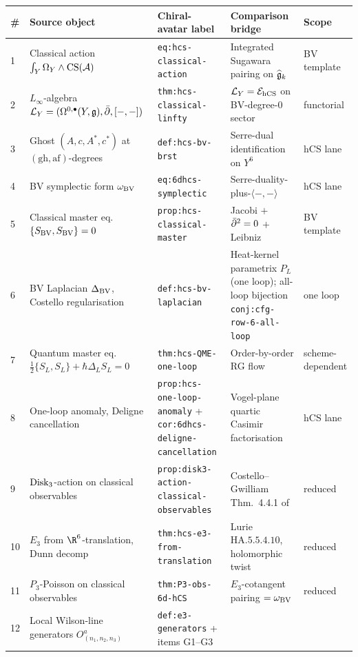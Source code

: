 {\small
\begin{center}
\renewcommand{\arraystretch}{1.20}
\begin{tabular}{p{0.7cm}p{3.5cm}p{3.3cm}p{3.3cm}p{1.9cm}}
\toprule
\# & Source object
 & Chiral-avatar label
 & Comparison bridge
 & Scope \\
\midrule
1 & Classical action $\int_Y\Omega_Y\wedge\mathrm{CS}(\mathcal{A})$
 & \texttt{eq:hcs-classical-action}
 & Integrated Sugawara pairing on $\widehat{\mathfrak{g}}_k$
 & BV template \\
2 & $L_\infty$-algebra $\mathcal{L}_Y = (\Omega^{0,\bullet}(Y,\mathfrak{g}),\bar\partial,[-,-])$
 & \texttt{thm:hcs-classical-linfty}
 & $\mathcal{L}_Y = \mathcal{E}_{\mathrm{hCS}}$ on BV-degree-$0$ sector
 & functorial \\
3 & Ghost $(A, c, A^*, c^*)$ at $(\mathrm{gh},\mathrm{af})$-degrees
 & \texttt{def:hcs-bv-brst}
 & Serre-dual identification on $Y^6$
 & hCS lane \\
4 & BV symplectic form $\omega_{\mathrm{BV}}$
 & \texttt{eq:6dhcs-symplectic}
 & Serre-duality-plus-$\langle-,-\rangle$
 & hCS lane \\
5 & Classical master eq.\ $\{S_{\mathrm{BV}},S_{\mathrm{BV}}\} = 0$
 & \texttt{prop:hcs-classical-master}
 & Jacobi $+$ $\bar\partial^2 = 0$ $+$ Leibniz
 & BV template \\
6 & BV Laplacian $\Delta_{\mathrm{BV}}$, Costello regularisation
 & \texttt{def:hcs-bv-laplacian}
 & Heat-kernel parametrix $P_L$ (one loop); all-loop bijection
 \texttt{conj:cfg-row-6-all-loop}
 & one loop \\
7 & Quantum master eq.\ $\tfrac12\{S_L,S_L\}+\hbar\Delta_L S_L=0$
 & \texttt{thm:hcs-QME-one-loop}
 & Order-by-order RG flow
 & scheme-dependent \\
8 & One-loop anomaly, Deligne cancellation
 & \texttt{prop:hcs-one-loop-anomaly} + \texttt{cor:6dhcs-deligne-cancellation}
 & Vogel-plane quartic Casimir factorisation
 & hCS lane \\
9 & $\mathrm{Disk}_3$-action on classical observables
 & \texttt{prop:disk3-action-classical-observables}
 & Costello--Gwilliam Thm.~4.4.1 of \cite{CG17}
 & reduced \\
10 & $E_3$ from $\R^6$-translation, Dunn decomp
 & \texttt{thm:hcs-e3-from-translation}
 & Lurie $\mathrm{HA}.5.5.4.10$, holomorphic twist
 & reduced \\
11 & $P_3$-Poisson on classical observables
 & \texttt{thm:P3-obs-6d-hCS}
 & $E_3$-cotangent pairing $=\omega_{\mathrm{BV}}$
 & reduced \\
12 & Local Wilson-line generators $O^a_{(n_1,n_2,n_3)}$
 & \texttt{def:e3-generators} + items G1--G3

\end{tabular}
\end{center}}

